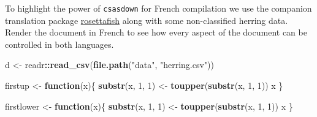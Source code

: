 \documentclass[12pt]{article}\usepackage[]{graphicx}\usepackage[]{color}
\newenvironment{Shaded}{}{}
\newcommand{\KeywordTok}[1]{\textcolor[rgb]{0.00,0.44,0.13}{\textbf{{#1}}}}
\newcommand{\DecValTok}[1]{\textcolor[rgb]{0.25,0.63,0.44}{{#1}}}
\newcommand{\StringTok}[1]{\textcolor[rgb]{0.25,0.44,0.63}{{#1}}}
\newcommand{\NormalTok}[1]{{#1}}
\newcommand{\OperatorTok}[1]{\textcolor[rgb]{0.00,0.44,0.13}{\textbf{{#1}}}}
\newcommand{\ControlFlowTok}[1]{\textcolor[rgb]{0.00,0.44,0.13}{\textbf{{#1}}}}
\begin{document}
To highlight the power of \texttt{csasdown} for French compilation we use the companion translation package \href{https://github.com/pbs-assess/rosettafish}{rosettafish} along with some non-classified herring data. Render the document in French to see how every aspect of the document can be controlled in both languages.
\begin{Shaded}
\begin{Highlighting}[]
\NormalTok{d <-}\StringTok{ }\NormalTok{readr}\OperatorTok{::}\KeywordTok{read_csv}\NormalTok{(}\KeywordTok{file.path}\NormalTok{(}\StringTok{"data"}\NormalTok{, }\StringTok{"herring.csv"}\NormalTok{))}

\NormalTok{firstup <-}\StringTok{ }\ControlFlowTok{function}\NormalTok{(x)\{}
  \KeywordTok{substr}\NormalTok{(x, }\DecValTok{1}\NormalTok{, }\DecValTok{1}\NormalTok{) <-}\StringTok{ }\KeywordTok{toupper}\NormalTok{(}\KeywordTok{substr}\NormalTok{(x, }\DecValTok{1}\NormalTok{, }\DecValTok{1}\NormalTok{))}
\NormalTok{  x}
\NormalTok{\}}

\NormalTok{firstlower <-}\StringTok{ }\ControlFlowTok{function}\NormalTok{(x)\{}
  \KeywordTok{substr}\NormalTok{(x, }\DecValTok{1}\NormalTok{, }\DecValTok{1}\NormalTok{) <-}\StringTok{ }\KeywordTok{toupper}\NormalTok{(}\KeywordTok{substr}\NormalTok{(x, }\DecValTok{1}\NormalTok{, }\DecValTok{1}\NormalTok{))}
\NormalTok{  x}
\NormalTok{\}}


\end{Highlighting}
\end{Shaded}
\end{document}
